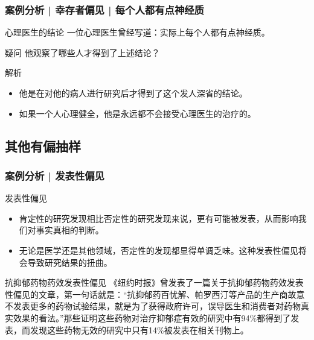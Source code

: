 \begin{frame}
  \frametitle{案例分析 | 幸存者偏见 | 每个人都有点神经质}
  \begin{block}{心理医生的结论}
    一位心理医生曾经写道：实际上每个人都有点神经质。
  \end{block}
  \pause \pause \pause \pause
  \begin{block}{疑问}
    他观察了哪些人才得到了上述结论？
  \end{block}
  \pause
  \begin{block}{解析}
    \begin{itemize}
      \item 他是在对他的病人进行研究后才得到了这个发人深省的结论。
      \item 如果一个人心理健全，他是永远都不会接受心理医生的治疗的。
    \end{itemize}
  \end{block}
\end{frame}

\subsection{其他有偏抽样}
\begin{frame}
  \frametitle{案例分析 | 发表性偏见}
  \begin{block}{发表性偏见}
    \begin{itemize}
      \item 肯定性的研究发现相比否定性的研究发现来说，更有可能被发表，从而影响我们对事实真相的判断。
      \item 无论是医学还是其他领域，否定性的发现都显得单调乏味。这种发表性偏见将会导致研究结果的扭曲。
    \end{itemize}
  \end{block}
  \pause
  \begin{block}{抗抑郁药物药效发表性偏见}
    《纽约时报》曾发表了一篇关于抗抑郁药物药效发表性偏见的文章，第一句话就是：“抗抑郁药百忧解、帕罗西汀等产品的生产商故意不发表更多的药物试验结果，就是为了获得政府许可，误导医生和消费者对药物真实效果的看法。”那些证明这些药物对治疗抑郁症有效的研究中有94\%都得到了发表，而发现这些药物无效的研究中只有14\%被发表在相关刊物上。
  \end{block}
\end{frame}

